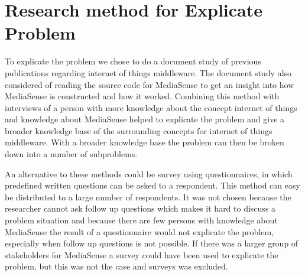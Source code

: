 \section{Research method for Explicate Problem}
To explicate the problem we chose to do a document study of previous publications regarding internet of things middleware. The document study also considered of reading the source code for MediaSense to get an insight into how MediaSense is constructed and how it worked. Combining this method with interviews of a person with more knowledge about the concept internet of things and knowledge about MediaSense helped to explicate the problem and give a broader knowledge base of the surrounding concepts for internet of things middleware. With a broader knowledge base the problem can then be broken down into a number of subproblems. 

An alternative to these methods could be survey using questionnaires, in which predefined written questions can be asked to a respondent. This method can easy be distributed to a large number of respondents. It was not chosen because the researcher cannot ask follow up questions which makes it hard to discuss a problem situation and because there are few persons with knowledge about MediaSense the result of a questionnaire would not explicate the problem, especially when follow up questions is not possible. If there was a larger group of stakeholders for MediaSense a survey could have been used to explicate the problem, but this was not the case and surveys was excluded.
